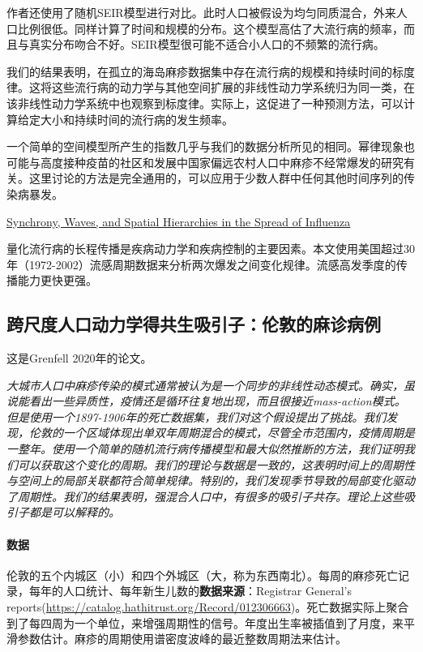 作者还使用了随机SEIR模型进行对比。此时人口被假设为均匀同质混合，外来人口比例很低。同样计算了时间和规模的分布。这个模型高估了大流行病的频率，而且与真实分布吻合不好。SEIR模型很可能不适合小人口的不频繁的流行病。

我们的结果表明，在孤立的海岛麻疹数据集中存在流行病的规模和持续时间的标度律。这将这些流行病的动力学与其他空间扩展的非线性动力学系统归为同一类，在该非线性动力学系统中也观察到标度律。实际上，这促进了一种预测方法，可以计算给定大小和持续时间的流行病的发生频率。

一个简单的空间模型所产生的指数几乎与我们的数据分析所见的相同。幂律现象也可能与高度接种疫苗的社区和发展中国家偏远农村人口中麻疹不经常爆发的研究有关。这里讨论的方法是完全通用的，可以应用于少数人群中任何其他时间序列的传染病暴发。
    
\href{https://science.sciencemag.org/content/sci/312/5772/447.full.pdf}{Synchrony, Waves, and Spatial Hierarchies in the Spread of Influenza}

量化流行病的长程传播是疾病动力学和疾病控制的主要因素。本文使用美国超过30年（1972-2002）流感周期数据来分析两次爆发之间变化规律。流感高发季度的传播能力更快更强。

\subsection{跨尺度人口动力学得共生吸引子：伦敦的麻诊病例}

这是Grenfell 2020年的论文。

\textit{大城市人口中麻疹传染的模式通常被认为是一个同步的非线性动态模式。确实，虽说能看出一些异质性，疫情还是循环往复地出现，而且很接近mass-action模式。但是使用一个1897-1906年的死亡数据集，我们对这个假设提出了挑战。我们发现，伦敦的一个区域体现出单双年周期混合的模式，尽管全市范围内，疫情周期是一整年。使用一个简单的随机流行病传播模型和最大似然推断的方法，我们证明我们可以获取这个变化的周期。我们的理论与数据是一致的，这表明时间上的周期性与空间上的局部关联都符合简单规律。特别的，我们发现季节导致的局部变化驱动了周期性。我们的结果表明，强混合人口中，有很多的吸引子共存。理论上这些吸引子都是可以解释的。}

\paragraph{数据}

伦敦的五个内城区（小）和四个外城区（大，称为东西南北）。每周的麻疹死亡记录，每年的人口统计、每年新生儿数的\textbf{数据来源}：Registrar General's reports(\href{1897 Weekly return of birth and deaths in London and other great towns}{https://catalog.hathitrust.org/Record/012306663})。死亡数据实际上聚合到了每四周为一个单位，来增强周期性的信号。年度出生率被插值到了月度，来平滑参数估计。麻疹的周期使用谱密度波峰的最近整数周期法来估计。

